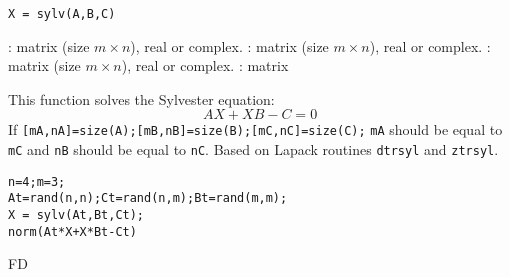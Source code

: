 
\begin{mandesc}
\end{mandesc}

\begin{calling_sequence}
\begin{verbatim}
X = sylv(A,B,C)
\end{verbatim}
\end{calling_sequence}
\begin{parameters}
  \begin{varlist}
    : matrix (size $m \times n$), real or complex.
    : matrix (size $m \times n$), real or complex.
    : matrix (size $m \times n$), real or complex.
    : matrix
  \end{varlist}
\end{parameters}

\begin{mandescription}
This function solves the Sylvester equation:
$$
 A X + X B - C = 0
$$
If \verb![mA,nA]=size(A);[mB,nB]=size(B);[mC,nC]=size(C);!
\verb!mA! should be equal to \verb!mC! and \verb!nB!  should be equal to
\verb!nC!. 
Based on Lapack routines \verb!dtrsyl! and \verb!ztrsyl!.
\end{mandescription}

\begin{examples}
\begin{Verbatim}
n=4;m=3;
At=rand(n,n);Ct=rand(n,m);Bt=rand(m,m);
X = sylv(At,Bt,Ct);
norm(At*X+X*Bt-Ct)
\end{Verbatim}
\end{examples}


\begin{authors}
   FD
\end{authors}
